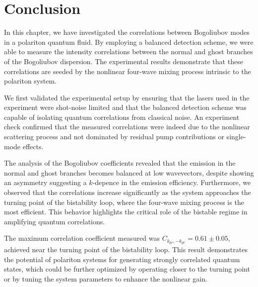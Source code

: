 \section{Conclusion}

In this chapter, we have investigated the correlations between Bogoliubov modes in a polariton quantum fluid. By employing a balanced detection scheme, we were able to measure the intensity correlations between the normal and ghost branches of the Bogoliubov dispersion. The experimental results demonstrate that these correlations are seeded by the nonlinear four-wave mixing process intrinsic to the polariton system.

We first validated the experimental setup by ensuring that the lasers used in the experiment were shot-noise limited and that the balanced detection scheme was capable of isolating quantum correlations from classical noise. An experiment check confirmed that the measured correlations were indeed due to the nonlinear scattering process and not dominated by residual pump contributions or single-mode effects.

The analysis of the Bogoliubov coefficients revealed that the emission in the normal and ghost branches becomes balanced at low wavevectors, despite showing an asymmetry suggesting a $k$-depence in the emission efficiency. Furthermore, we observed that the correlations increase significantly as the system approaches the turning point of the bistability loop, where the four-wave mixing process is the most efficient. This behavior highlights the critical role of the bistable regime in amplifying quantum correlations.

The maximum correlation coefficient measured was $C_{k_{pr},-k_{pr}} = 0.61 \pm 0.05$, achieved near the turning point of the bistability loop. This result demonstrates the potential of polariton systems for generating strongly correlated quantum states, which could be further optimized by operating closer to the turning point or by tuning the system parameters to enhance the nonlinear gain.

